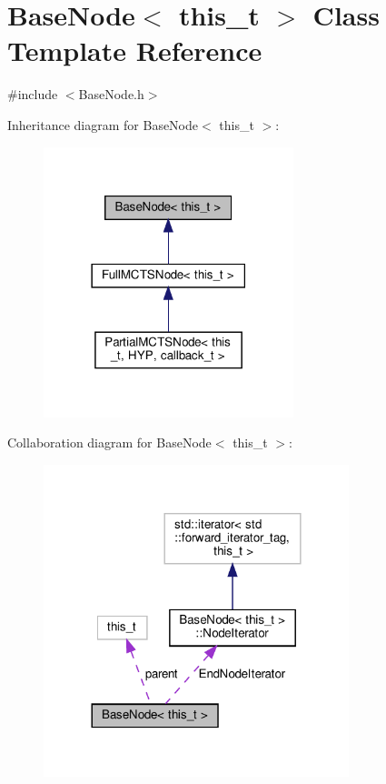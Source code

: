 \hypertarget{class_base_node}{}\section{Base\+Node$<$ this\+\_\+t $>$ Class Template Reference}
\label{class_base_node}


{\ttfamily \#include $<$Base\+Node.\+h$>$}



Inheritance diagram for Base\+Node$<$ this\+\_\+t $>$\+:\nopagebreak
\begin{figure}[H]
\begin{center}
\leavevmode
\includegraphics[width=206pt]{class_base_node__inherit__graph}
\end{center}
\end{figure}


Collaboration diagram for Base\+Node$<$ this\+\_\+t $>$\+:\nopagebreak
\begin{figure}[H]
\begin{center}
\leavevmode
\includegraphics[width=252pt]{class_base_node__coll__graph}
\end{center}
\end{figure}
